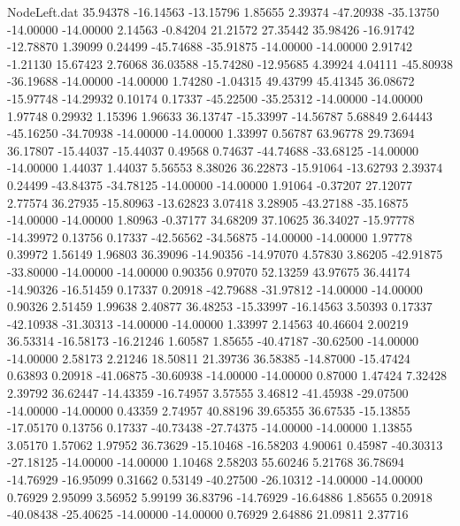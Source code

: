 \begin{filecontents}{NodeLeft.dat}
  35.94378  -16.14563  -13.15796     1.85655    2.39374  -47.20938  -35.13750  -14.00000  -14.00000    2.14563   -0.84204   21.21572   27.35442
  35.98426  -16.91742  -12.78870     1.39099    0.24499  -45.74688  -35.91875  -14.00000  -14.00000    2.91742   -1.21130   15.67423    2.76068
  36.03588  -15.74280  -12.95685     4.39924    4.04111  -45.80938  -36.19688  -14.00000  -14.00000    1.74280   -1.04315   49.43799   45.41345
  36.08672  -15.97748  -14.29932     0.10174    0.17337  -45.22500  -35.25312  -14.00000  -14.00000    1.97748    0.29932    1.15396    1.96633
  36.13747  -15.33997  -14.56787     5.68849    2.64443  -45.16250  -34.70938  -14.00000  -14.00000    1.33997    0.56787   63.96778   29.73694
  36.17807  -15.44037  -15.44037     0.49568    0.74637  -44.74688  -33.68125  -14.00000  -14.00000    1.44037    1.44037    5.56553    8.38026
  36.22873  -15.91064  -13.62793     2.39374    0.24499  -43.84375  -34.78125  -14.00000  -14.00000    1.91064   -0.37207   27.12077    2.77574
  36.27935  -15.80963  -13.62823     3.07418    3.28905  -43.27188  -35.16875  -14.00000  -14.00000    1.80963   -0.37177   34.68209   37.10625
  36.34027  -15.97778  -14.39972     0.13756    0.17337  -42.56562  -34.56875  -14.00000  -14.00000    1.97778    0.39972    1.56149    1.96803
  36.39096  -14.90356  -14.97070     4.57830    3.86205  -42.91875  -33.80000  -14.00000  -14.00000    0.90356    0.97070   52.13259   43.97675
  36.44174  -14.90326  -16.51459     0.17337    0.20918  -42.79688  -31.97812  -14.00000  -14.00000    0.90326    2.51459    1.99638    2.40877
  36.48253  -15.33997  -16.14563     3.50393    0.17337  -42.10938  -31.30313  -14.00000  -14.00000    1.33997    2.14563   40.46604    2.00219
  36.53314  -16.58173  -16.21246     1.60587    1.85655  -40.47187  -30.62500  -14.00000  -14.00000    2.58173    2.21246   18.50811   21.39736
  36.58385  -14.87000  -15.47424     0.63893    0.20918  -41.06875  -30.60938  -14.00000  -14.00000    0.87000    1.47424    7.32428    2.39792
  36.62447  -14.43359  -16.74957     3.57555    3.46812  -41.45938  -29.07500  -14.00000  -14.00000    0.43359    2.74957   40.88196   39.65355
  36.67535  -15.13855  -17.05170     0.13756    0.17337  -40.73438  -27.74375  -14.00000  -14.00000    1.13855    3.05170    1.57062    1.97952
  36.73629  -15.10468  -16.58203     4.90061    0.45987  -40.30313  -27.18125  -14.00000  -14.00000    1.10468    2.58203   55.60246    5.21768
  36.78694  -14.76929  -16.95099     0.31662    0.53149  -40.27500  -26.10312  -14.00000  -14.00000    0.76929    2.95099    3.56952    5.99199
  36.83796  -14.76929  -16.64886     1.85655    0.20918  -40.08438  -25.40625  -14.00000  -14.00000    0.76929    2.64886   21.09811    2.37716

\end{filecontents}

